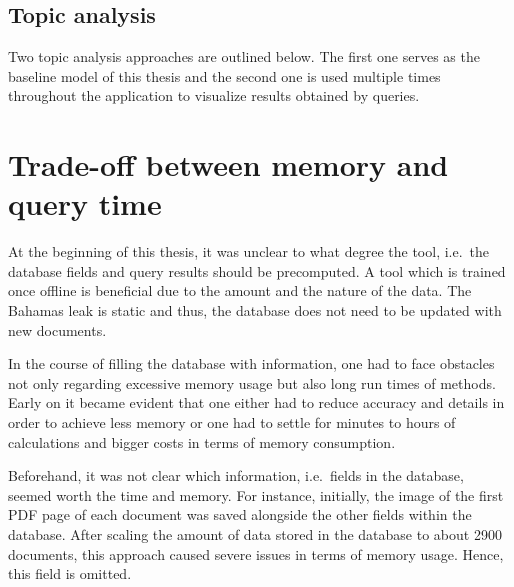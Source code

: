 







\subsection{Topic analysis}\label{impl-topic-modeling}

Two topic analysis approaches are outlined below.
The first one serves as the baseline model of this thesis and 
the second one is used multiple times throughout the application to visualize results obtained by queries.









\newpage
\section{Trade-off between memory and query time}\label{sec:trade-off}

At the beginning of this thesis, it was unclear to what degree the tool, 
i.e.\ the database fields and query results should be precomputed.
A tool which is trained once offline is beneficial due to the amount and the nature of the data.
The Bahamas leak is static and thus, the database does not need to be updated with new documents.

In the course of filling the database with information, 
one had to face obstacles not only regarding excessive memory usage but also long run times of methods.
Early on it became evident that one either had to reduce accuracy and details in order to achieve less memory or 
one had to settle for minutes to hours of calculations and bigger costs in terms of memory consumption.

Beforehand, it was not clear which information, i.e.\ fields in the database, seemed worth the time and memory.
For instance, initially, the image of the first PDF page of each document was saved alongside the other fields within the database.
After scaling the amount of data stored in the database to about 2900 documents, 
this approach caused severe issues in terms of memory usage.
Hence, this field is omitted.